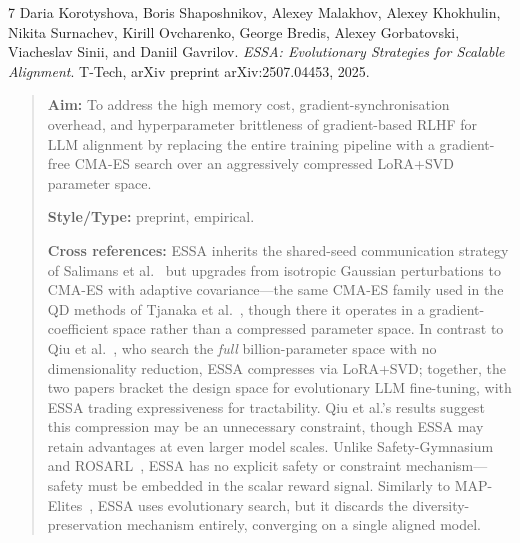\documentclass[12pt, a4paper]{article}
\begin{document}
\begin{thebibliography}{7}
Daria Korotyshova, Boris Shaposhnikov, Alexey Malakhov, Alexey Khokhulin, Nikita Surnachev, Kirill Ovcharenko, George Bredis, Alexey Gorbatovski, Viacheslav Sinii, and Daniil Gavrilov.
\textit{ESSA: Evolutionary Strategies for Scalable Alignment}.
T-Tech, arXiv preprint arXiv:2507.04453, 2025.

\begin{quotation}
\noindent
\textbf{Aim:} To address the high memory cost, gradient-synchronisation overhead, and hyperparameter brittleness of gradient-based RLHF for LLM alignment by replacing the entire training pipeline with a gradient-free CMA-ES search over an aggressively compressed LoRA+SVD parameter space.

\textbf{Style/Type:} preprint, empirical.

\textbf{Cross references:} ESSA inherits the shared-seed communication strategy of Salimans et al.~\cite{salimans2017evolution} but upgrades from isotropic Gaussian perturbations to CMA-ES with adaptive covariance---the same CMA-ES family used in the QD methods of Tjanaka et al.~\cite{tjanaka2022approximating}, though there it operates in a gradient-coefficient space rather than a compressed parameter space. In contrast to Qiu et al.~\cite{qiu2026evolution}, who search the \emph{full} billion-parameter space with no dimensionality reduction, ESSA compresses via LoRA+SVD; together, the two papers bracket the design space for evolutionary LLM fine-tuning, with ESSA trading expressiveness for tractability. Qiu et al.'s results suggest this compression may be an unnecessary constraint, though ESSA may retain advantages at even larger model scales. Unlike Safety-Gymnasium~\cite{ji2023safety} and ROSARL~\cite{nanguetasse2024rosarl}, ESSA has no explicit safety or constraint mechanism---safety must be embedded in the scalar reward signal. Similarly to MAP-Elites~\cite{mouret2015illuminating}, ESSA uses evolutionary search, but it discards the diversity-preservation mechanism entirely, converging on a single aligned model.


\end{quotation}
\end{thebibliography}
\end{document}
